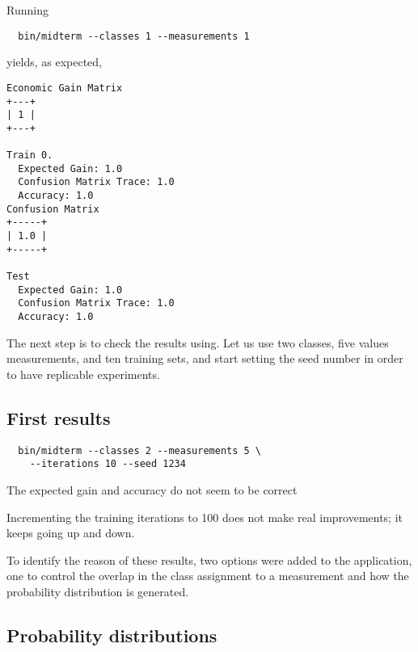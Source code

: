 \documentclass[letterpaper, conference]{IEEEtran}
\begin{document}
Running

\begin{verbatim}
  bin/midterm --classes 1 --measurements 1
\end{verbatim}

yields, as expected,

\begin{verbatim}
Economic Gain Matrix
+---+
| 1 |
+---+

Train 0.
  Expected Gain: 1.0
  Confusion Matrix Trace: 1.0
  Accuracy: 1.0
Confusion Matrix
+-----+
| 1.0 |
+-----+

Test
  Expected Gain: 1.0
  Confusion Matrix Trace: 1.0
  Accuracy: 1.0
\end{verbatim}


The next step is to check the results using. Let us use two classes, five values measurements, and ten training sets, and start setting the seed number in order to have replicable experiments.

\subsection{First results}

\begin{verbatim}
  bin/midterm --classes 2 --measurements 5 \
    --iterations 10 --seed 1234
\end{verbatim}

The expected gain and accuracy do not seem to be correct

\begin{figure}[hbt]
  \label{fig:10-training-2-classes}
  
  \caption{}
\end{figure}

Incrementing the training iterations to 100 does not make real improvements; it keeps going up and down.

\begin{figure}[hbt]
  \label{fig:100-training-2-classes}
  
  \caption{}
\end{figure}

To identify the reason of these results, two options were added to the application, one to control the overlap in the class assignment to a measurement and how the probability distribution is generated.

\subsection{Probability distributions}
\end{document}
